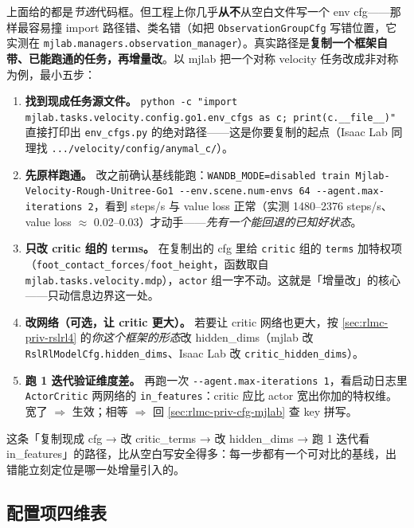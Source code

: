 上面给的都是\emph{节选}代码框。但工程上你几乎\textbf{从不}从空白文件写一个 env cfg——那样最容易撞 import 路径错、类名错（如把 \verb|ObservationGroupCfg| 写错位置，它实测在 \verb|mjlab.managers.observation_manager|）。真实路径是\textbf{复制一个框架自带、已能跑通的任务，再增量改}。以 mjlab 把一个对称 velocity 任务改成非对称为例，最小五步：

\begin{enumerate}
  \item \textbf{找到现成任务源文件。} \verb|python -c "import mjlab.tasks.velocity.config.go1.env_cfgs as c; print(c.__file__)"| 直接打印出 \verb|env_cfgs.py| 的绝对路径——这是你要复制的起点（Isaac Lab 同理找 \verb|.../velocity/config/anymal_c/|）。
  \item \textbf{先原样跑通。} 改之前确认基线能跑：\verb|WANDB_MODE=disabled train Mjlab-Velocity-Rough-Unitree-Go1 --env.scene.num-envs 64 --agent.max-iterations 2|，看到 steps/s 与 value loss 正常（实测 1480--2376 steps/s、value loss $\approx$ 0.02--0.03）才动手——\emph{先有一个能回退的已知好状态}。
  \item \textbf{只改 critic 组的 terms。} 在复制出的 cfg 里给 \verb|critic| 组的 \verb|terms| 加特权项（\verb|foot_contact_forces|/\verb|foot_height|，函数取自 \verb|mjlab.tasks.velocity.mdp|），\verb|actor| 组一字不动。这就是「增量改」的核心——只动信息边界这一处。
  \item \textbf{改网络（可选，让 critic 更大）。} 若要让 critic 网络也更大，按 \cref{sec:rlmc-priv-rslrl4} 的\emph{你这个框架的形态}改 hidden\_dims（mjlab 改 \verb|RslRlModelCfg.hidden_dims|、Isaac Lab 改 \verb|critic_hidden_dims|）。
  \item \textbf{跑 1 迭代验证维度差。} 再跑一次 \verb|--agent.max-iterations 1|，看启动日志里 \verb|ActorCritic| 两网络的 \verb|in_features|：critic 应比 actor 宽出你加的特权维。宽了 $\Rightarrow$ 生效；相等 $\Rightarrow$ 回 \cref{sec:rlmc-priv-cfg-mjlab} 查 key 拼写。
\end{enumerate}

这条「复制现成 cfg → 改 critic\_terms → 改 hidden\_dims → 跑 1 迭代看 in\_features」的路径，比从空白写安全得多：每一步都有一个可对比的基线，出错能立刻定位是哪一处增量引入的。

\subsection{配置项四维表}
\label{sec:rlmc-priv-cfg4d}

